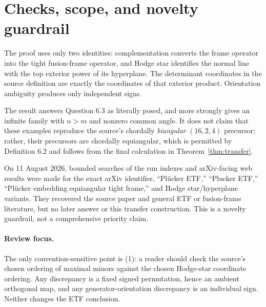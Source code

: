 \documentclass[11pt]{article}
\begin{document}
\section{Checks, scope, and novelty guardrail}

The proof uses only two identities: complementation converts the frame
operator into the tight fusion-frame operator, and Hodge star identifies the
normal line with the top exterior power of its hyperplane.  The determinant
coordinates in the source definition are exactly the coordinates of that
exterior product.  Orientation ambiguity produces only independent signs.

The result answers Question 6.3 as literally posed, and more strongly gives
an infinite family with $n>m$ and nonzero common angle.  It does not claim
that these examples reproduce the source's chordally \emph{biangular}
$(16,2,4)$ precursor; rather, their precursors are chordally equiangular,
which is permitted by Definition 6.2 and follows from the final calculation
in Theorem~\ref{thm:transfer}.

On 11 August 2026, bounded searches of the run indexes and arXiv-facing web
results were made for the exact arXiv identifier, ``Pl\"ucker ETF,''
``Plucker ETF,'' ``Pl\"ucker embedding equiangular tight frame,'' and Hodge
star/hyperplane variants.  They recovered the source paper and general ETF or
fusion-frame literature, but no later answer or this transfer construction.
This is a novelty guardrail, not a comprehensive priority claim.

\paragraph{Review focus.}
The only convention-sensitive point is (1): a reader should check the source's
chosen ordering of maximal minors against the chosen Hodge-star coordinate
ordering.  Any discrepancy is a fixed signed permutation, hence an ambient
orthogonal map, and any generator-orientation discrepancy is an individual
sign.  Neither changes the ETF conclusion.
\end{document}
